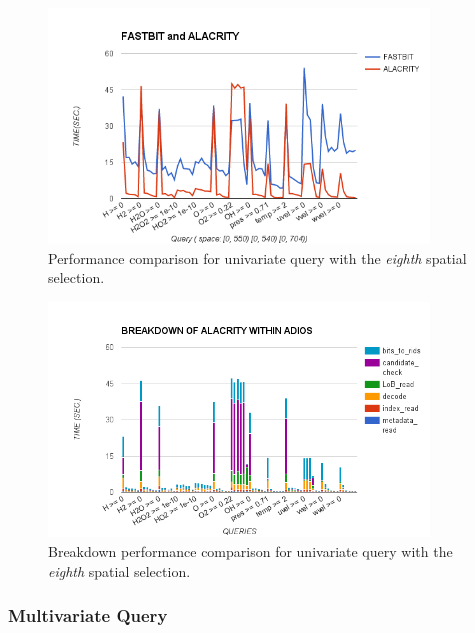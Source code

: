 \documentclass[11pt,a4paper]{article}
\begin{document}
\begin{figure}[ht]             
\begin{center}                 
    \includegraphics[width=0.90\textwidth]{figures/perf/alac-adios/uniquery-eighth-space}
\end{center}
\caption{Performance comparison for univariate query with the \emph{eighth} spatial selection.}
\label{fig:uniquery-eighth}  
\end{figure}


\begin{figure}[ht]             
\begin{center}                 
    \includegraphics[width=0.90\textwidth]{figures/perf/alac-adios/breakdown-uniquery-eighth-space}
\end{center}
\caption{Breakdown performance comparison for univariate query with the \emph{eighth} spatial selection.}
\label{fig:uniquery-eighth-breakdown}  
\end{figure}


\subsubsection{Multivariate Query}
\end{document}
